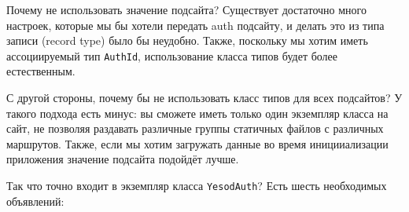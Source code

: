 \begin{remark}
Почему не использовать значение подсайта? Существует достаточно много настроек, которые мы бы хотели передать auth подсайту, и делать это из типа записи (record type) было бы неудобно. Также, поскольку мы хотим иметь ассоциируемый тип \lstinline'AuthId', использование класса типов будет более естественным.

С другой стороны, почему бы не использовать класс типов для всех подсайтов? У такого подхода есть минус: вы сможете иметь только один экземпляр класса на сайт, не позволяя раздавать различные группы статичных файлов с различных маршрутов. Также, если мы хотим загружать данные во время иницииализации приложения значение подсайта подойдёт лучше.
\end{remark}

Так что точно входит в экземпляр класса \lstinline'YesodAuth'? Есть шесть необходимых объявлений:

